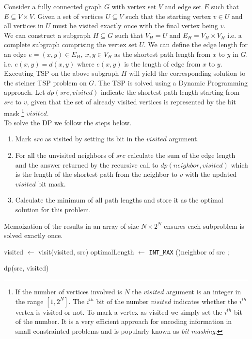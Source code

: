 \documentclass{article}
\begin{document}
Consider a fully connected graph $G$ with vertex set $V$ and edge set $E$ such that $E \subseteq V \times V$. 
Given a set of vertices $U \subseteq V$ such that the starting vertex $v \in U$ and all vertices in $U$ must be visited
exactly once with the final vertex being $v$. \\

We can construct a subgraph $H \subseteq G$ such that $V_H = U$ and $E_H = V_H \times V_H$ i.e. a complete subgraph
comprising the vertex set $U$. We can define the edge length for an edge $e = (x,y) \in E_H,\ x,y \in V_H $ as the shortest
path length from $x$ to $y$ in $G$. i.e. $e(x,y) = d(x,y)$ where $e(x,y)$ is the length of edge from $x$ to $y$. \\

Executing TSP on the above subgraph $H$ will yield the corresponding solution to the steiner TSP problem on $G$. The TSP is 
solved using a Dynamic Programming approach. Let $dp(src, visited)$ indicate the shortest path length starting from $src$ to 
$v$, given that the set of already visited vertices is represented by the bit mask 
\footnote{
    If the number of vertices involved is $N$ the $visited$ argument is an integer in the range $[1, 2^N]$. The $i^{th}$ bit of
    the number $visited$ indicates whether the $i^{th}$ vertex is visited or not. To mark a vertex as visited we simply set the $i^{th}$
    bit of the number. It is a very efficient approach for encoding information in small constrainted problems and is popularly known as \textit{bit masking}.
}
$visited$. \\

To solve the DP we follow the steps below.
\begin{enumerate}
    \item Mark $src$ as visited by setting its bit in the $visited$ argument.
    \item For all the unvisited neighbors of $src$ calculate the sum of the edge length and the answer returned by the recursive call to $dp(neighbor, visited)$ which is the length of the shortest path from the neighbor to $v$ with the updated $visited$ bit mask.
    \item Calculate the minimum of all path lengths and store it as the optimal solution for this problem.
\end{enumerate}
Memoization of the results in an array of size $N \times 2^N$ ensures each subproblem is solved exactly once.

\begin{algorithm}[H]
    \SetAlgoLined
    visited $\gets$ visit(visited, src)\;
    optimalLength $\gets$ \verb|INT_MAX|\;
    \ForAll(){neighbor of src}{
    }
    ;
    \caption{dp(src, visited)}
\end{algorithm}
\end{document}
